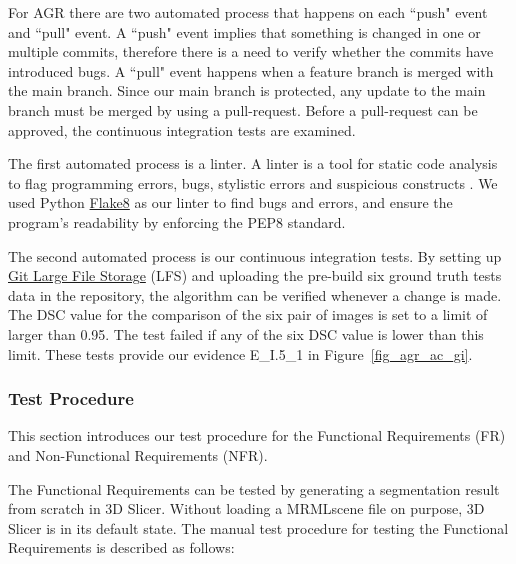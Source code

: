For AGR there are two automated process that happens on each ``push" event and ``pull" event. A ``push" event implies that something is changed in one or multiple commits, therefore there is a need to verify whether the commits have introduced bugs. A ``pull" event happens when a feature branch is merged with the main branch. Since our main branch is protected, any update to the main branch must be merged by using a pull-request. Before a pull-request can be approved, the continuous integration tests are examined. 

The first automated process is a linter. A linter is a tool for static code analysis to flag programming errors, bugs, stylistic errors and suspicious constructs  \cite{Linter}. We used Python \href{https://flake8.pycqa.org/en/latest/index.html#}{Flake8} as our linter to find bugs and errors, and ensure the program's readability by enforcing the PEP8 standard.

The second automated process is our continuous integration tests. By setting up \href{https://git-lfs.com/}{Git Large File Storage} (LFS) and uploading the pre-build six ground truth tests data in the repository, the algorithm can be verified whenever a change is made. The DSC value for the comparison of the six pair of images is set to a limit of larger than 0.95. The test failed if any of the six DSC value is lower than this limit. These tests provide our evidence E\_I.5\_1 in Figure~\ref{fig_agr_ac_gi}.

\subsubsection{Test Procedure}

This section introduces our test procedure for the Functional Requirements (FR) and Non-Functional Requirements (NFR).

The Functional Requirements can be tested by generating a segmentation result from scratch in 3D Slicer. Without loading a MRMLscene file on purpose, 3D Slicer is in its default state. The manual test procedure for testing the Functional Requirements is described as follows:

